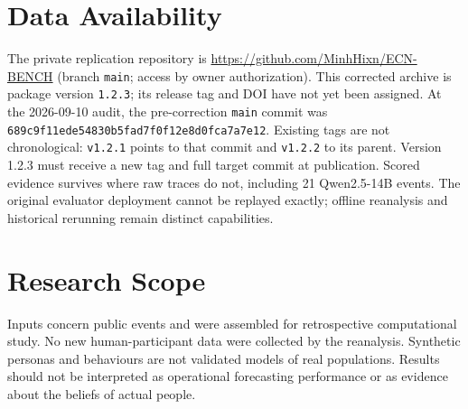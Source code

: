 \documentclass[10pt,conference]{IEEEtran}
\begin{document}
\section*{Data Availability}
The private replication repository is
\url{https://github.com/MinhHixn/ECN-BENCH} (branch \texttt{main}; access by owner
authorization). This corrected archive is package version \texttt{1.2.3}; its
release tag and DOI have not yet been assigned. At the 2026-09-10 audit, the
pre-correction \texttt{main} commit was
\nolinkurl{689c9f11ede54830b5fad7f0f12e8d0fca7a7e12}. Existing tags are not
chronological: \texttt{v1.2.1} points to that commit and \texttt{v1.2.2} to its
parent. Version 1.2.3 must receive a new tag and full target commit at publication.
Scored evidence survives where raw
traces do not, including 21 Qwen2.5-14B events. The original evaluator deployment
cannot be replayed exactly; offline reanalysis and historical rerunning remain
distinct capabilities.

\section*{Research Scope}
Inputs concern public events and were assembled for retrospective computational
study. No new human-participant data were collected by the reanalysis.
Synthetic personas and behaviours are not validated models of real populations.
Results should not be interpreted as operational forecasting performance
or as evidence about the beliefs of actual people.



\end{document}
